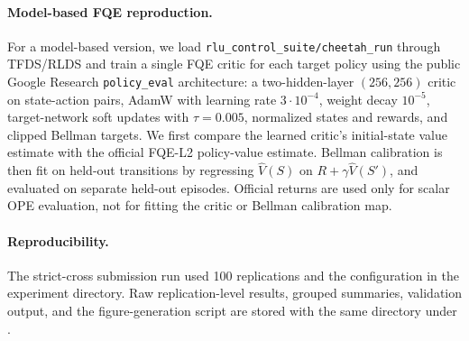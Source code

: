 \paragraph{Model-based FQE reproduction.}
For a model-based version, we load
\texttt{rlu\_control\_suite/cheetah\_run} through TFDS/RLDS and train a single
FQE critic for each target policy using the public Google Research
\texttt{policy\_eval} architecture: a two-hidden-layer \((256,256)\) critic on
state-action pairs, AdamW with learning rate \(3\cdot10^{-4}\), weight decay
\(10^{-5}\), target-network soft updates with \(\tau=0.005\), normalized states
and rewards, and clipped Bellman targets. We first compare the learned critic's
initial-state value estimate with the official FQE-L2 policy-value estimate.
Bellman calibration is then fit on held-out transitions by regressing
\(\widehat V(S)\) on \(R+\gamma \widehat V(S')\), and evaluated on separate
held-out episodes. Official returns are used only for scalar OPE evaluation, not
for fitting the critic or Bellman calibration map.

\paragraph{Reproducibility.}
The strict-cross submission run used 100 replications and the configuration
 in the
 experiment directory. Raw replication-level
results, grouped summaries, validation output, and the figure-generation script
are stored with the same directory under
.
